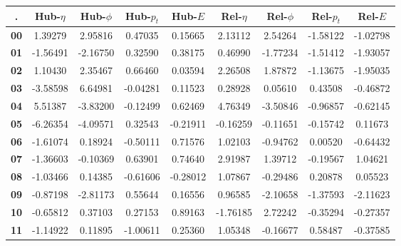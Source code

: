 \begin{tabular}{|c|c|c|c|c|c|c|c|c|}
    \hline
    . & \textbf{Hub-$\eta$} & \textbf{Hub-$\phi$} & \textbf{Hub-$p_t$} & \textbf{Hub-$E$} & \textbf{Rel-$\eta$} & \textbf{Rel-$\phi$} & \textbf{Rel-$p_t$} & \textbf{Rel-$E$} \\
    \hline
    \textbf{00} &  1.39279 &  2.95816 &  0.47035 &  0.15665 &  2.13112 &  2.54264 & -1.58122 & -1.02798 \\ 
    \textbf{01} & -1.56491 & -2.16750 &  0.32590 &  0.38175 &  0.46990 & -1.77234 & -1.51412 & -1.93057 \\ 
    \textbf{02} &  1.10430 &  2.35467 &  0.66460 &  0.03594 &  2.26508 &  1.87872 & -1.13675 & -1.95035 \\ 
    \textbf{03} & -3.58598 &  6.64981 & -0.04281 &  0.11523 &  0.28928 &  0.05610 &  0.43508 & -0.46872 \\ 
    \textbf{04} &  5.51387 & -3.83200 & -0.12499 &  0.62469 &  4.76349 & -3.50846 & -0.96857 & -0.62145 \\ 
    \textbf{05} & -6.26354 & -4.09571 &  0.32543 & -0.21911 & -0.16259 & -0.11651 & -0.15742 &  0.11673 \\ 
    \textbf{06} & -1.61074 &  0.18924 & -0.50111 &  0.71576 &  1.02103 & -0.94762 &  0.00520 & -0.64432 \\ 
    \textbf{07} & -1.36603 & -0.10369 &  0.63901 &  0.74640 &  2.91987 &  1.39712 & -0.19567 &  1.04621 \\ 
    \textbf{08} & -1.03466 &  0.14385 & -0.61606 & -0.28012 &  1.07867 & -0.29486 &  0.20878 &  0.05523 \\ 
    \textbf{09} & -0.87198 & -2.81173 &  0.55644 &  0.16556 &  0.96585 & -2.10658 & -1.37593 & -2.11623 \\ 
    \textbf{10} & -0.65812 &  0.37103 &  0.27153 &  0.89163 & -1.76185 &  2.72242 & -0.35294 & -0.27357 \\ 
    \textbf{11} & -1.14922 &  0.11895 & -1.00611 &  0.25360 &  1.05348 & -0.16677 &  0.58487 & -0.37585 \\
    \hline
\end{tabular}